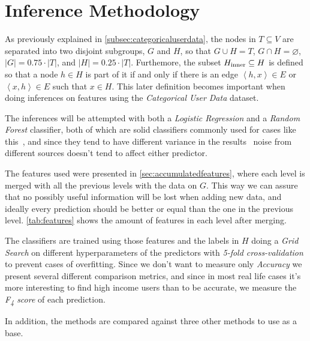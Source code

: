 \section{Inference Methodology}
\label{sec:inference_methodology}

As previously explained in \cref{subsec:categoricaluserdata}, the nodes in $T \subseteq V$ are separated into two disjoint subgroups, $G$ and $H$, so that $G \cup H = T$, $G \cap H = \varnothing$, $\left| G \right| = 0.75 \cdot \left| T \right|$, and $\left| H \right| = 0.25 \cdot \left| T \right|$. Furthemore, the subset $H_{\operatorname{inner}} \subseteq H$ is defined so that a node $h \in H$ is part of it if and only if there is an edge $\left< h, x \right> \in E$ or $\left< x, h \right> \in E$ such that $x \in H$\footnotemark{}. This later definition becomes important when doing inferences on features using the \emph{Categorical User Data} dataset.


The inferences will be attempted with both a \emph{Logistic Regression} and a \emph{Random Forest} classifier, both of which are solid classifiers commonly used for cases like this~\cite{binaryevaluation}, and since they tend to have different variance in the results~\cite{ting2016} noise from different sources doesn't tend to affect either predictor.

The features used were presented in \cref{sec:accumulatedfeatures}, where each level is merged with all the previous levels with the data on $G$. This way we can assure that no possibly useful information will be lost when adding new data, and ideally every prediction should be better or equal than the one in the previous level. \cref{tab:features} shows the amount of features in each level after merging.

The classifiers are trained using those features and the labels in $H$ doing a \emph{Grid Search} on different hyperparameters of the predictors with \emph{5-fold cross-validation} to prevent cases of overfitting. Since we don't want to measure only \emph{Accuracy} we present several different comparison metrics, and since in most real life cases it's more interesting to find high income users than to be accurate\footnotemark{}, we measure the \emph{F\textsubscript{4} score} of each prediction.


In addition, the methods are compared against three other methods to use as a base.

